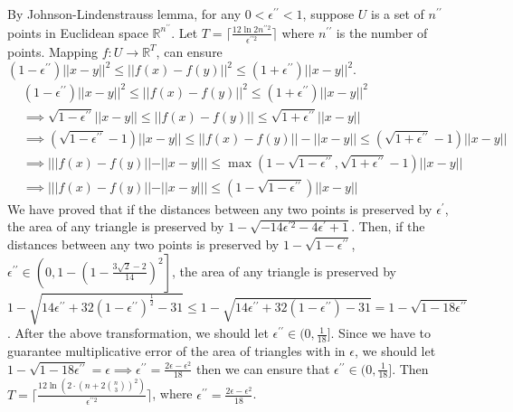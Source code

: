 By Johnson-Lindenstrauss lemma, for any $0<\epsilon^{\prime\prime}<1$, suppose $U$ is a set of $n^{\prime\prime}$ points in Euclidean space $\mathbb{R}^{n^{\prime \prime}}$.
Let $T=\lceil \frac{12\ln2n^{\prime\prime 2}}{\epsilon^{\prime\prime 2}} \rceil$ where $n^{\prime\prime}$ is the number of points. 
Mapping $f: U\rightarrow \mathbb{R}^T$,
can ensure $(1-\epsilon^{\prime\prime})||x-y||^2\le||f(x)-f(y)||^2\le(1+\epsilon^{\prime\prime})||x-y||^2$.
\begin{align}
    \nonumber &(1-\epsilon^{\prime\prime})||x-y||^2\le||f(x)-f(y)||^2\le (1+\epsilon^{\prime\prime})||x-y||^2\\
    \nonumber &\implies \sqrt{1-\epsilon^{\prime\prime}}||x-y||\le||f(x)-f(y)||\le \sqrt{1+\epsilon^{\prime\prime}}||x-y||\\
    \nonumber &\implies (\sqrt{1-\epsilon^{\prime\prime}}-1)||x-y||\le ||f(x)-f(y)||-||x-y||\le (\sqrt{1+\epsilon^{\prime\prime}}-1)||x-y||\\
    \nonumber &\implies |||f(x)-f(y)||-||x-y|||\le \max( 1- \sqrt{1-\epsilon^{\prime\prime}},\sqrt{1+\epsilon^{\prime\prime}}-1 )||x-y||\\
    \nonumber &\implies |||f(x)-f(y)||-||x-y|||\le ( 1- \sqrt{1-\epsilon^{\prime\prime}})||x-y||
\end{align}
We have proved that 
if the distances between any two points is preserved by $\epsilon^{\prime}$, the area of any triangle is preserved by $1-\sqrt{-14\epsilon^{\prime 2}-4\epsilon^{\prime}+1}$.
Then, if the distances between any two points is preserved by $1- \sqrt{1-\epsilon^{\prime\prime}}$, $\epsilon^{\prime\prime} \in \left(0,1-\left(1-\frac{3\sqrt{2}-2}{14}\right)^2\right]$, 
the area of any triangle is preserved by $1-\sqrt{14\epsilon^{\prime\prime}+32(1-\epsilon^{\prime\prime})^{\frac{1}{2}}-31}\le 1-\sqrt{14\epsilon^{\prime\prime}+32(1-\epsilon^{\prime\prime})-31}=1-\sqrt{1-18\epsilon^{\prime\prime}}$.
After the above transformation, we should let $\epsilon^{\prime\prime} \in (0,\frac{1}{18}]$.
Since we have to guarantee  multiplicative error of the area of triangles with in $\epsilon$, 
we should let  $1-\sqrt{1-18\epsilon^{\prime\prime}}=\epsilon \implies \epsilon^{\prime\prime}=\frac{2\epsilon-\epsilon^2}{18}$ 
then we can ensure that $\epsilon^{\prime\prime} \in (0,\frac{1}{18}]$.
Then $T=\Bigg\lceil \frac{12\ln\left(2\cdot \left(n+2\binom{n}{3}\right)^2\right)  }{\epsilon^{\prime \prime 2}} \Bigg\rceil$, where $\epsilon^{\prime\prime}=\frac{2\epsilon-\epsilon^2}{18}$.